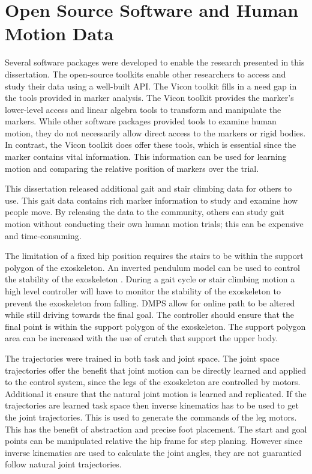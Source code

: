 \section{Open Source Software and Human Motion Data}

Several software packages were developed to enable the research presented in this dissertation. The open-source toolkits enable other researchers to access and study their data using a well-built API. The Vicon toolkit fills in a need gap in the tools provided in marker analysis. The Vicon toolkit provides the marker's lower-level access and linear algebra tools to transform and manipulate the markers. While other software packages provided tools to examine human motion, they do not necessarily allow direct access to the markers or rigid bodies. In contrast, the Vicon toolkit does offer these tools, which is essential since the marker contains vital information. This information can be used for learning motion and comparing the relative position of markers over the trial. 

This dissertation released additional gait and stair climbing data for others to use. This gait data contains rich marker information to study and examine how people move. By releasing the data to the community, others can study gait motion without conducting their own human motion trials; this can be expensive and time-consuming. 

The limitation of a fixed hip position requires the stairs to be within the support polygon of the exoskeleton. An inverted pendulum model can be used to control the stability of the exoskeleton \cite{chen2018dynamic}. During a gait cycle or stair climbing motion a high level controller will have to monitor the stability of the exoskeleton to prevent the exoskeleton from falling. DMPS allow for online path to be altered while still driving towards the final goal. The controller should ensure that the final point is within the support polygon of the exoskeleton. The support polygon area can be increased with the use of crutch that support the upper body.   

The trajectories were trained in both task and joint space. The joint space trajectories offer the benefit that joint motion can be directly learned and applied to the control system, since the legs of the exoskeleton are controlled by motors. Additional it ensure that the natural joint motion is learned and replicated. If the trajectories are learned task space then inverse kinematics has to be used to get the joint trajectories. This is used to generate the commands of the leg motors. This has the benefit of abstraction and precise foot placement. The start and goal points can be manipulated relative the hip frame for step planing. However since inverse kinematics are used to calculate the joint angles, they are not guarantied follow natural joint trajectories.   

